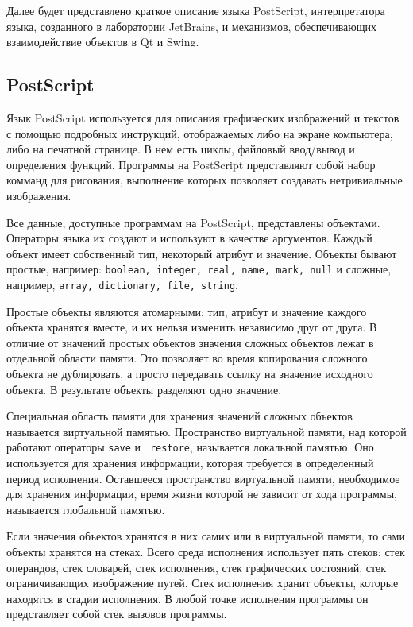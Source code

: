 Далее будет представлено краткое описание языка PostScript, интерпретатора языка, созданного в лаборатории JetBrains, и механизмов, обеспечивающих взаимодействие объектов в Qt и Swing.


\subsection{PostScript}

Язык PostScript используется для описания графических изображений и текстов с помощью подробных инструкций, отображаемых либо на экране компьютера, либо на печатной странице. В нем есть циклы, файловый ввод/вывод и определения функций. Программы на PostScript представляют собой набор комманд для рисования, выполнение которых позволяет создавать нетривиальные изображения.

Все данные, доступные программам на PostScript, представлены объектами. Операторы языка их создают и используют в качестве аргументов. Каждый объект имеет собственный тип, некоторый атрибут и значение. 
Объекты бывают простые, например: \texttt{boolean, integer, real, name, mark, null} и сложные, например, \texttt{array, dictionary, file, string}.    

Простые объекты являются атомарными: тип, атрибут и значение каждого объекта хранятся вместе, и их нельзя изменить независимо друг от друга. В отличие от значений простых объектов значения сложных объектов лежат в отдельной области памяти. Это позволяет во время копирования сложного объекта не дублировать, а просто передавать ссылку на значение исходного объекта. В результате объекты разделяют одно значение.

Специальная область памяти для хранения значений сложных объектов называется виртуальной памятью. Пространство виртуальной памяти, над которой работают операторы \texttt{save} и \texttt{ restore}, называется локальной памятью. Оно используется для хранения информации, которая требуется в определенный период исполнения. Оставшееся пространство виртуальной памяти, необходимое для хранения информации, время жизни которой не зависит от хода программы, называется глобальной памятью.

Если значения объектов хранятся в них самих или в виртуальной памяти, то сами объекты хранятся на стеках. Всего среда исполнения использует пять стеков: стек операндов, стек словарей, стек исполнения, стек графических состояний, стек ограничивающих изображение путей. Стек исполнения хранит объекты, которые находятся в стадии исполнения. В любой точке исполнения программы он представляет собой стек вызовов программы.

